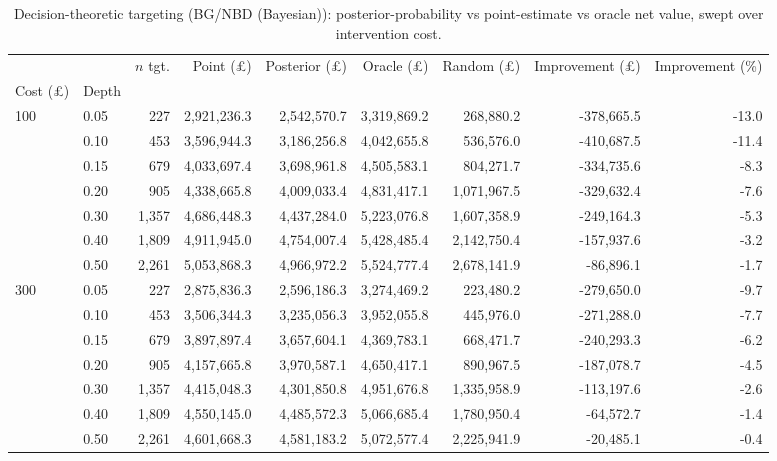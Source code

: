 \begin{table}[htbp]
\centering
\caption{Decision-theoretic targeting (BG/NBD (Bayesian)): posterior-probability vs point-estimate vs oracle net value, swept over intervention cost.}
\label{tab:targeting_sim_bg_nbd_bayesian}
\begin{adjustbox}{max width=\linewidth}
\begin{tabular}{llrrrrrrr}
\toprule
 &  & $n$ tgt. & Point (\pounds) & Posterior (\pounds) & Oracle (\pounds) & Random (\pounds) & Improvement (\pounds) & Improvement (\%) \\
Cost (\pounds) & Depth &  &  &  &  &  &  &  \\
\midrule
\multirow[t]{7}{*}{100} & 0.05 & 227 & 2,921,236.3 & 2,542,570.7 & 3,319,869.2 & 268,880.2 & -378,665.5 & -13.0 \\
 & 0.10 & 453 & 3,596,944.3 & 3,186,256.8 & 4,042,655.8 & 536,576.0 & -410,687.5 & -11.4 \\
 & 0.15 & 679 & 4,033,697.4 & 3,698,961.8 & 4,505,583.1 & 804,271.7 & -334,735.6 & -8.3 \\
 & 0.20 & 905 & 4,338,665.8 & 4,009,033.4 & 4,831,417.1 & 1,071,967.5 & -329,632.4 & -7.6 \\
 & 0.30 & 1,357 & 4,686,448.3 & 4,437,284.0 & 5,223,076.8 & 1,607,358.9 & -249,164.3 & -5.3 \\
 & 0.40 & 1,809 & 4,911,945.0 & 4,754,007.4 & 5,428,485.4 & 2,142,750.4 & -157,937.6 & -3.2 \\
 & 0.50 & 2,261 & 5,053,868.3 & 4,966,972.2 & 5,524,777.4 & 2,678,141.9 & -86,896.1 & -1.7 \\
\cline{1-9}
\multirow[t]{7}{*}{300} & 0.05 & 227 & 2,875,836.3 & 2,596,186.3 & 3,274,469.2 & 223,480.2 & -279,650.0 & -9.7 \\
 & 0.10 & 453 & 3,506,344.3 & 3,235,056.3 & 3,952,055.8 & 445,976.0 & -271,288.0 & -7.7 \\
 & 0.15 & 679 & 3,897,897.4 & 3,657,604.1 & 4,369,783.1 & 668,471.7 & -240,293.3 & -6.2 \\
 & 0.20 & 905 & 4,157,665.8 & 3,970,587.1 & 4,650,417.1 & 890,967.5 & -187,078.7 & -4.5 \\
 & 0.30 & 1,357 & 4,415,048.3 & 4,301,850.8 & 4,951,676.8 & 1,335,958.9 & -113,197.6 & -2.6 \\
 & 0.40 & 1,809 & 4,550,145.0 & 4,485,572.3 & 5,066,685.4 & 1,780,950.4 & -64,572.7 & -1.4 \\
 & 0.50 & 2,261 & 4,601,668.3 & 4,581,183.2 & 5,072,577.4 & 2,225,941.9 & -20,485.1 & -0.4 \\

\end{tabular}
\end{adjustbox}
\end{table}
